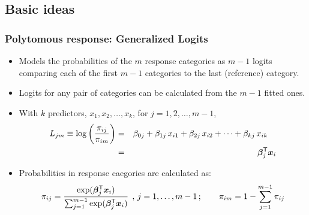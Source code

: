 \renewcommand{\FileName}{genlogit}
\subsection{Basic ideas}
\begin{frame}
  \frametitle{Polytomous response: Generalized Logits}
  \begin{itemize}
	\item Models the probabilities of the $m$ response categories 
	as \(m - 1\) logits comparing
each of the first \(m - 1\) categories to the last (reference) category.
	\item Logits for any  pair of categories can be calculated
from the \(m - 1\) fitted ones.
	\item With $k$ predictors, \(x_1, x_2, \dots , x_k\), for $j=1, 2, \dots ,
	  m-1$, 
\begin{eqnarray*}
  L_{jm}  \equiv 
    \log \left( \frac{\pi_{ij}}{\pi_{im}} \right) & = & \beta_{0j}  +
  \beta _{1j} \,  x_{i1}  +
  \beta _{2j} \,  x_{i2}  + \cdots +
  \beta _{kj} \,  x_{ik} \quad \\
  & = & \bm{\beta}_j ^\mathsf{T} \bm{x}_i
\end{eqnarray*}

	\item Probabilities in response caegories are calculated as:
\begin{equation*}
\pi_{ij} =
 \frac{ \exp ( \bm{\beta}_j ^\mathsf{T} \bm{x}_i ) }
      { \sum_{j=1}^{m-1} \exp ( \bm{\beta}_j ^\mathsf{T} \bm{x}_i ) }
	  \:\: , \, j=1,\dots, m-1 \,;
	  \quad\quad \pi_{im} = 1 - \sum_{j=1}^{m-1} \pi_{ij}
\end{equation*}
  \end{itemize}
\end{frame}

